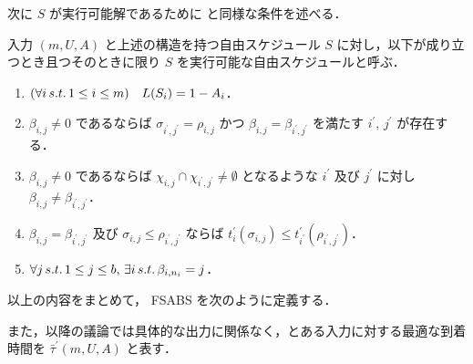 次に $S$ が実行可能解であるために \textcite{czyzowicz} と同様な条件を述べる．
\begin{definition}\label{definition:fsabs-feasible-schedule}
  入力 $(m, U, A)$ と上述の構造を持つ自由スケジュール $S$ に対し，以下が成り立つとき且つそのときに限り $S$ を実行可能な自由スケジュールと呼ぶ．
  \begin{enumerate}
  \item $(\forall i\,s.t.\, 1 \leq i \leq m)\quad L(S_i) = 1 - A_i$．
  \item $\beta_{i,j} \neq 0$ であるならば $\sigma_{i^\prime, j^\prime} = \rho_{i,j} \text{ かつ } \beta_{i,j} = \beta_{i^\prime, j^\prime}$ を満たす $i^\prime$, $j^\prime$ が存在する．
  \item $\beta_{i,j} \neq 0$ であるならば $\chi_{i,j} \cap \chi_{i^\prime,j^\prime} \neq \emptyset$ となるような $i^\prime$ 及び $j^\prime$ に対し $\beta_{i,j} \neq \beta_{i^\prime,j ^\prime}$．
  \item $\beta_{i,j} = \beta_{i^\prime, j^\prime}$ 及び $\sigma_{i,j} \leq \rho_{i^\prime, j^{\prime}}$ ならば $t^{\prime}_i(\sigma_{i, j}) \leq t^{\prime}_{i^\prime}(\rho_{i^\prime, j^\prime})$．
  \item $\forall j \,s.t.\, 1 \leq j \leq b,\, \exists i \,s.t.\, \beta_{i,n_i} = j$．
  \end{enumerate}
\end{definition}

以上の内容をまとめて， FSABS を次のように定義する．
\begin{problem}
\end{problem}
また，以降の議論では具体的な出力に関係なく，とある入力に対する最適な到着時間を $\bar\tau^\prime(m, U, A)$ と表す．

